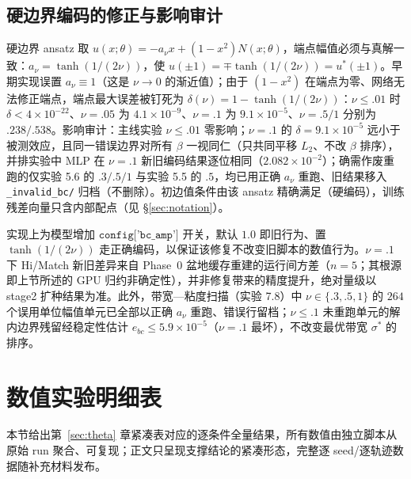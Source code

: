 \documentclass[fontset=windows,11pt]{ctexart}
\numberwithin{equation}{section}
\begin{document}
\subsection{硬边界编码的修正与影响审计}
硬边界 ansatz 取 $u(x;\theta)=-a_\nu x+(1-x^2)N(x;\theta)$，端点幅值必须与真解一致：$a_\nu=\tanh(1/(2\nu))$，使 $u(\pm1)=\mp\tanh(1/(2\nu))=u^*(\pm1)$。早期实现误置 $a_\nu\equiv1$（这是 $\nu\to0$ 的渐近值）；由于 $(1-x^2)$ 在端点为零、网络无法修正端点，端点最大误差被钉死为 $\delta(\nu)=1-\tanh(1/(2\nu))$：$\nu\le.01$ 时 $\delta<4\times10^{-22}$、$\nu=.05$ 为 $4.1\times10^{-9}$、$\nu=.1$ 为 $9.1\times10^{-5}$、$\nu=.5/1$ 分别为 $.238/.538$。影响审计：主线实验 $\nu\le.01$ 零影响；$\nu=.1$ 的 $\delta=9.1\times10^{-5}$ 远小于被测效应，且同一错误边界对所有 $\beta$ 一视同仁（只共同平移 $L_2$、不改 $\beta$ 排序），并排实验中 MLP 在 $\nu=.1$ 新旧编码结果逐位相同（$2.082\times10^{-2}$）；确需作废重跑的仅实验 5.6 的 $.3/.5/1$ 与实验 5.5 的 $.5$，均已用正确 $a_\nu$ 重跑、旧结果移入 \texttt{\_\hspace{0pt}invalid\_\hspace{0pt}bc/\hspace{0pt}} 归档（不删除）。初边值条件由该 ansatz 精确满足（硬编码），训练残差向量只含内部配点（见 \S\ref{sec:notation}）。\par\smallskip
实现上为模型增加 $\texttt{config['bc\_amp']}$ 开关，默认 $1.0$ 即旧行为、置 $\tanh(1/(2\nu))$ 走正确编码，以保证该修复不改变旧脚本的数值行为。$\nu=.1$ 下 Hi/Match 新旧差异来自 Phase~0 盆地缓存重建的运行间方差（$n=5$；其根源即上节所述的 GPU 归约非确定性），并非修复带来的精度提升，绝对量级以 stage2 扩种结果为准。此外，带宽—粘度扫描（实验 7.8）中 $\nu\in\{.3,.5,1\}$ 的 $264$ 个误用单位幅值单元已全部以正确 $a_\nu$ 重跑、错误行留档；$\nu\le.1$ 未重跑单元的解内边界残留经稳定性估计 $e_{bc}\le5.9\times10^{-5}$（$\nu=.1$ 最坏），不改变最优带宽 $\sigma^*$ 的排序。

\FloatBarrier
\clearpage


\section{数值实验明细表}\label{app:data}
\footnotesize\setlength{\tabcolsep}{2.6pt}  %
本节给出第~\ref{sec:theta} 章紧凑表对应的逐条件全量结果，所有数值由独立脚本从原始 run 聚合、可复现；正文只呈现支撑结论的紧凑形态，完整逐 seed/逐轨迹数据随补充材料发布。
\end{document}
